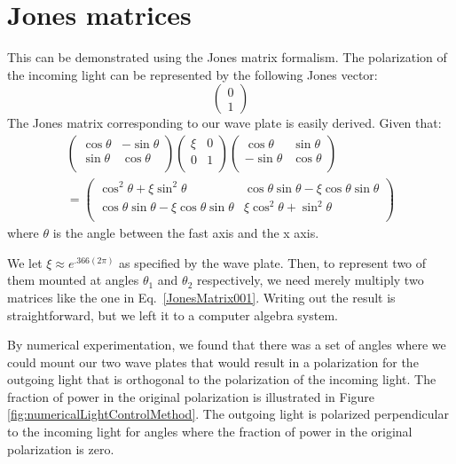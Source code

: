 \section{Jones matrices}
This can be demonstrated using the Jones matrix formalism. The polarization of the incoming light can be represented by the following Jones vector: 
\begin{equation}
\begin{pmatrix}
0\\1
\end{pmatrix}
\end{equation}
The Jones matrix corresponding to our wave plate is easily derived. Given that: 
\begin{multline}
\begin{pmatrix}
\cos\theta & - \sin \theta \\
\sin \theta & \cos\theta \\
\end{pmatrix}
\begin{pmatrix}
\xi & 0 \\
0 & 1 \\
\end{pmatrix}
\begin{pmatrix}
\cos\theta &  \sin \theta \\
-\sin \theta & \cos\theta \\
\end{pmatrix} \\
=
\begin{pmatrix}
\cos ^2 \theta+\xi \sin^2 \theta &  \cos\theta \sin \theta-\xi \cos\theta \sin \theta \\
\cos\theta \sin \theta-\xi \cos \theta \sin\theta & \xi \cos^2 \theta + \sin^2 \theta \\ \label{JonesMatrix001}
\end{pmatrix}
\end{multline}
where $\theta$ is the angle between the fast axis and the x axis. 

We let $\xi\approx e^{.366 (2 \pi)}$ as specified by the wave plate. Then, to represent two of them mounted at angles $\theta_1$ and $\theta_2$ respectively, we need merely multiply two matrices like the one in Eq.\ \ref{JonesMatrix001}. Writing out the result is straightforward, but we left it to a computer algebra system.

By numerical experimentation, we found that there was a set of angles where we could mount our two wave plates that would result in a polarization for the outgoing light that is orthogonal to the polarization of the incoming light. The fraction of power in the original polarization is illustrated in Figure\,\ref{fig:numericalLightControlMethod}. The outgoing light is polarized perpendicular to the incoming light for angles where the fraction of power in the original polarization is zero.

